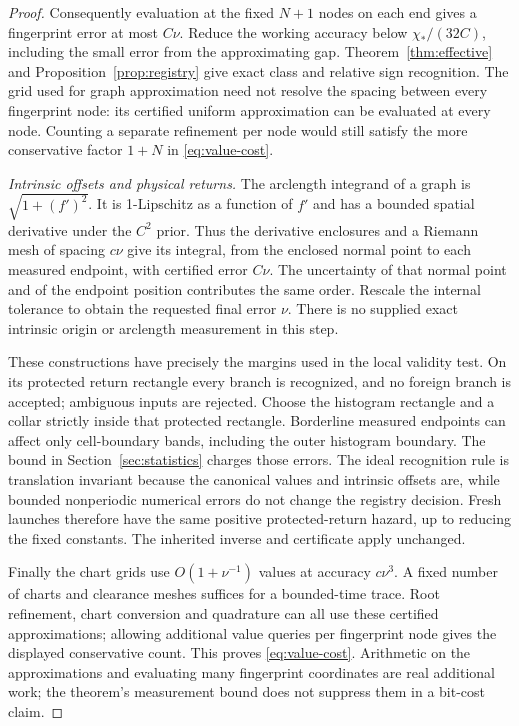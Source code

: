 \begin{proof}
Consequently evaluation at the fixed $N+1$ nodes on each end gives a
fingerprint error at most $C\nu$. Reduce the working accuracy below
$\chi_*/(32C)$, including the small error from the approximating gap.
Theorem~\ref{thm:effective} and Proposition~\ref{prop:registry} give
exact class and relative sign recognition. The grid used for graph
approximation need not resolve the spacing between every fingerprint
node: its certified uniform approximation can be evaluated at every
node. Counting a separate refinement per node would still satisfy the
more conservative factor $1+N$ in \eqref{eq:value-cost}.

\emph{Intrinsic offsets and physical returns.}
The arclength integrand of a graph is $\sqrt{1+(f')^2}$. It is
1-Lipschitz as a function of $f'$ and has a bounded spatial derivative
under the $C^2$ prior. Thus the derivative enclosures and a Riemann mesh
of spacing $c\nu$ give its integral, from the enclosed normal point
to each measured endpoint, with certified error $C\nu$. The uncertainty
of that normal point and of the endpoint position contributes the same
order. Rescale the internal tolerance to obtain the requested final
error $\nu$. There is no supplied exact intrinsic origin or arclength
measurement in this step.

These constructions have precisely the margins used in the local
validity test. On its protected return rectangle every branch is
recognized, and no foreign branch is accepted; ambiguous inputs are
rejected. Choose the histogram rectangle and a collar strictly inside
that protected rectangle. Borderline measured endpoints can affect
only cell-boundary bands, including the outer histogram boundary.
The bound in Section~\ref{sec:statistics} charges those errors. The
ideal recognition rule is translation invariant because the canonical
values and intrinsic offsets are, while bounded nonperiodic numerical
errors do not change the registry decision. Fresh launches therefore
have the same positive protected-return hazard, up to reducing the
fixed constants. The inherited inverse and certificate apply unchanged.

Finally the chart grids use $O(1+\nu^{-1})$ values at accuracy
$c\nu^3$. A fixed number of charts and clearance meshes suffices for
a bounded-time trace. Root refinement, chart conversion and quadrature
can all use these certified approximations; allowing additional value
queries per fingerprint node gives the displayed conservative count.
This proves \eqref{eq:value-cost}. Arithmetic on the approximations
and evaluating many fingerprint coordinates are real additional work;
the theorem's measurement bound does not suppress them in a bit-cost claim.
\end{proof}

